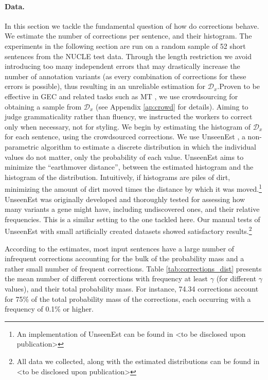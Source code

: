 \documentclass[letterpaper, 11pt]{article}
\newcommand{\com}[1]{}
\begin{document}
\paragraph{Data.}
In this section we tackle the fundamental question of how do corrections behave. We estimate the number of corrections per sentence, and their histogram.
The experiments in the following section are run on a random sample of 52 short sentences from the NUCLE test data. Through the length restriction we avoid introducing too many independent errors that may drastically increase the number of annotation variants (as every combination of corrections for these errors is possible), thus resulting in an unreliable estimation for $\mathcal{D}_x$.Proven to be effective in GEC \cite{madnani2011they} and related tasks such as MT \cite{zaidan2011crowdsourcing, post2012constructing}, 
we use crowdsourcing for obtaining a sample from $\mathcal{D}_x$ (see Appendix \ref{ap:crowd} for details).
Aiming to judge grammaticality rather than fluency, we instructed the workers to correct only when necessary, not for styling.
We begin by estimating the histogram of $\mathcal{D}_x$ for each sentence, using the crowdsourced corrections.
We use {\sc UnseenEst} \cite{zou2015quantifying}, a non-parametric algorithm to
estimate a discrete distribution in which the individual values do not matter, only the probability of each value. 
{\sc UnseenEst} aims to minimize the ``earthmover distance'', between the estimated histogram and the histogram of the distribution. 
Intuitively, if histograms are piles of dirt, minimizing the amount of dirt moved times the distance by 
which it was moved.\footnote{An implementation of {\sc UnseenEst} can be found in <to be disclosed upon publication>\com{\href{https://github.com/borgr/unseenest}}} 
{\sc UnseenEst} was originally developed and thoroughly tested for assessing how many
variants a gene might have, including undiscovered ones, and their relative frequencies.
This is a similar setting to the one tackled here.
Our manual tests of {\sc UnseenEst} with small artificially created datasets
showed satisfactory results.\footnote{All data we collected, along with the estimated
  distributions can be found in <to be disclosed upon publication>}

According to the estimates, most input sentences have a large number of
infrequent corrections accounting for the bulk of the probability mass
and a rather small number of frequent corrections.
Table \ref{tab:corrections_dist} presents the mean number of different corrections with frequency at least $\gamma$ (for different $\gamma$ values), and their total probability mass.
For instance, 74.34 corrections account for 75\% of the total probability mass of the corrections, each occurring with a frequency of 0.1\% or higher.
\end{document}
